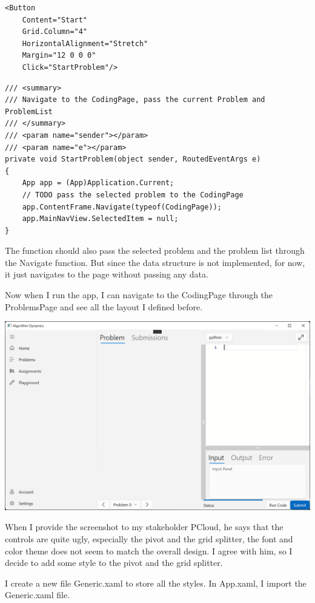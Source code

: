 \documentclass[a4paper]{report}
\begin{document}
\begin{verbatim}
<Button
    Content="Start"
    Grid.Column="4"
    HorizontalAlignment="Stretch"
    Margin="12 0 0 0"
    Click="StartProblem"/>
\end{verbatim}

\begin{verbatim}
/// <summary>
/// Navigate to the CodingPage, pass the current Problem and ProblemList
/// </summary>
/// <param name="sender"></param>
/// <param name="e"></param>
private void StartProblem(object sender, RoutedEventArgs e)
{
    App app = (App)Application.Current;
    // TODO pass the selected problem to the CodingPage
    app.ContentFrame.Navigate(typeof(CodingPage));
    app.MainNavView.SelectedItem = null;
}
\end{verbatim}

The function should also pass the selected problem and the problem list through the Navigate function. But since the data structure is not implemented, for now, it just navigates to the page without passing any data.

Now when I run the app, I can navigate to the CodingPage through the ProblemsPage and see all the layout I defined before.

\includegraphics[width=\textwidth, height=\textheight, keepaspectratio]{CodingPage-Layout}

When I provide the screenshot to my stakeholder PCloud, he says that the controls are quite ugly, especially the pivot and the grid splitter, the font and color theme does not seem to match the overall design. I agree with him, so I decide to add some style to the pivot and the grid splitter.

I create a new file Generic.xaml to store all the styles. In App.xaml, I import the Generic.xaml file.
\end{document}
